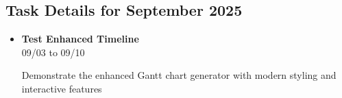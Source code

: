 \documentclass[landscape,a4paper]{article}
\begin{document}
\vspace{0.5cm}
\subsection{Task Details for September 2025}
\begin{itemize}[leftmargin=1cm, itemsep=0.8em]
    \item \textcolor{researchcore}{\textbf{Test Enhanced Timeline}}\\[0.2em]
          \textcolor{black!70}{\small 09/03 to 09/10}
\\[0.3em]
          \begin{minipage}[t]{0.85\textwidth}
          \textcolor{black!80}{Demonstrate the enhanced Gantt chart generator with modern styling and interactive features}
          \end{minipage}

\end{itemize}
\end{document}
